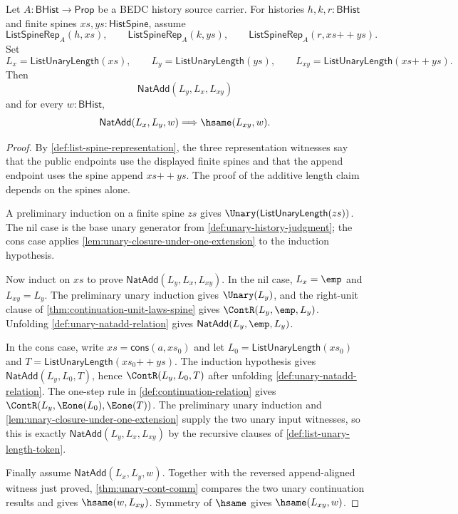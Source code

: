 \begin{theorem}
\label{thm:list-unary-length-append-additivity}
Let $A:\mathsf{BHist}\to\mathsf{Prop}$ be a BEDC history source carrier. For histories $h,k,r:\mathsf{BHist}$ and finite spines $xs,ys:\mathsf{HistSpine}$, assume
$$
\mathsf{ListSpineRep}_A(h,xs),\qquad
\mathsf{ListSpineRep}_A(k,ys),\qquad
\mathsf{ListSpineRep}_A(r,xs{++}ys).
$$
Set
$$
L_x=\mathsf{ListUnaryLength}(xs),\qquad
L_y=\mathsf{ListUnaryLength}(ys),\qquad
L_{xy}=\mathsf{ListUnaryLength}(xs{++}ys).
$$
Then
$$
\mathsf{NatAdd}(L_y,L_x,L_{xy})
$$
and for every $w:\mathsf{BHist}$,
$$
\mathsf{NatAdd}(L_x,L_y,w)\Longrightarrow \hsame(L_{xy},w).
$$
\end{theorem}
\begin{proof}
By \autoref{def:list-spine-representation}, the three representation witnesses say that the public endpoints use the displayed finite spines and that the append endpoint uses the spine append $xs{++}ys$. The proof of the additive length claim depends on the spines alone.

A preliminary induction on a finite spine $zs$ gives $\Unary(\mathsf{ListUnaryLength}(zs))$. The nil case is the base unary generator from \autoref{def:unary-history-judgment}; the cons case applies \autoref{lem:unary-closure-under-one-extension} to the induction hypothesis.

Now induct on $xs$ to prove $\mathsf{NatAdd}(L_y,L_x,L_{xy})$. In the nil case, $L_x=\emp$ and $L_{xy}=L_y$. The preliminary unary induction gives $\Unary(L_y)$, and the right-unit clause of \autoref{thm:continuation-unit-laws-spine} gives $\ContR(L_y,\emp,L_y)$. Unfolding \autoref{def:unary-natadd-relation} gives $\mathsf{NatAdd}(L_y,\emp,L_y)$.

In the cons case, write $xs=\mathsf{cons}(a,xs_0)$ and let $L_0=\mathsf{ListUnaryLength}(xs_0)$ and $T=\mathsf{ListUnaryLength}(xs_0{++}ys)$. The induction hypothesis gives $\mathsf{NatAdd}(L_y,L_0,T)$, hence $\ContR(L_y,L_0,T)$ after unfolding \autoref{def:unary-natadd-relation}. The one-step rule in \autoref{def:continuation-relation} gives $\ContR(L_y,\Eone(L_0),\Eone(T))$. The preliminary unary induction and \autoref{lem:unary-closure-under-one-extension} supply the two unary input witnesses, so this is exactly $\mathsf{NatAdd}(L_y,L_x,L_{xy})$ by the recursive clauses of \autoref{def:list-unary-length-token}.

Finally assume $\mathsf{NatAdd}(L_x,L_y,w)$. Together with the reversed append-aligned witness just proved, \autoref{thm:unary-cont-comm} compares the two unary continuation results and gives $\hsame(w,L_{xy})$. Symmetry of $\hsame$ gives $\hsame(L_{xy},w)$.
\end{proof}


